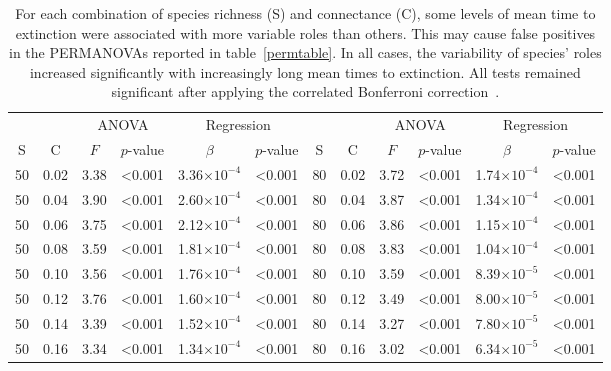 \documentclass[12pt]{article}
\begin{document}
\begin{spacing}{2.0}
		\begin{table}[h!]
			\caption{For each combination of species richness (S) and connectance (C), some levels of mean time to extinction were associated with more variable roles than others. This may cause false positives in the PERMANOVAs reported in table~\ref{permtable}. In all cases, the variability of species' roles increased significantly with increasingly long mean times to extinction. All tests remained significant after applying the correlated Bonferroni correction~\citep{Drezner2016}.}
			\label{disptable}
			\footnotesize
			\begin{tabular}{c c | c c| c c ||c c | c c | c c |}
				&		&	\multicolumn{2}{c|}{ANOVA}	&\multicolumn{2}{c||}{Regression} 			& & & 	\multicolumn{2}{c|}{ANOVA}		 	&	 \multicolumn{2}{c|}{Regression} 			\\
	            S	&	C	&	$F$	&	$p$-value	&	$\beta$	&	$p$-value	&	S	&	C	&	$F$	&	$p$-value	&	$\beta$	&	$p$-value	\\
				\hline
	        50	&	0.02	&	3.38	&	\textless0.001	&	3.36$\times10^{-4}$	&	\textless0.001	&	80	&	0.02	&	3.72	&	\textless0.001	&	1.74$\times10^{-4}$	&	\textless0.001	\\
	        50	&	0.04	&	3.90	&	\textless0.001	&	2.60$\times10^{-4}$	&	\textless0.001	&	80	&	0.04	&	3.87	&	\textless0.001	&	1.34$\times10^{-4}$	&	\textless0.001	\\
	        50	&	0.06	&	3.75	&	\textless0.001	&	2.12$\times10^{-4}$	&	\textless0.001	&	80	&	0.06	&	3.86	&	\textless0.001	&	1.15$\times10^{-4}$	&	\textless0.001	\\
	        50	&	0.08	&	3.59	&	\textless0.001	&	1.81$\times10^{-4}$	&	\textless0.001	&	80	&	0.08	&	3.83	&	\textless0.001	&	1.04$\times10^{-4}$	&	\textless0.001	\\
	        50	&	0.10	&	3.56	&	\textless0.001	&	1.76$\times10^{-4}$	&	\textless0.001	&	80	&	0.10	&	3.59	&	\textless0.001	&	8.39$\times10^{-5}$	&	\textless0.001	\\
	        50	&	0.12	&	3.76	&	\textless0.001	&	1.60$\times10^{-4}$	&	\textless0.001	&	80	&	0.12	&	3.49	&	\textless0.001	&	8.00$\times10^{-5}$	&	\textless0.001	\\
	        50	&	0.14	&	3.39	&	\textless0.001	&	1.52$\times10^{-4}$	&	\textless0.001	&	80	&	0.14	&	3.27	&	\textless0.001	&	7.80$\times10^{-5}$	&	\textless0.001	\\
	        50	&	0.16	&	3.34	&	\textless0.001	&	1.34$\times10^{-4}$	&	\textless0.001	&	80	&	0.16	&	3.02	&	\textless0.001	&	6.34$\times10^{-5}$	&	\textless0.001	\\

\end{tabular}
\end{table}
\end{spacing}
\end{document}
